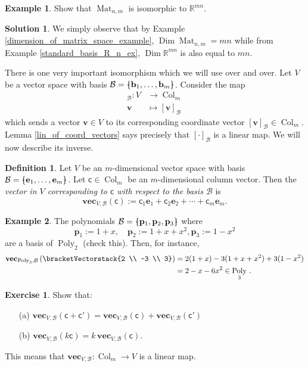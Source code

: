 \documentclass[a4paper,11pt]{book}
\theoremstyle{definition}
\newtheorem{definition}[theorem]{Definition}
\newtheorem{exercise}{Exercise}
\newtheorem{example_environment}{Example}[chapter]
\newtheorem*{solution}{Solution}
\newcommand{\ve}[1]{\mathbf{#1}}
\newcommand{\mat}[1]{\mathsf{#1}}
\newcommand{\basis}[1]{{\mathcal #1}}
\newcommand{\cvector}[1]{\bracketVectorstack{#1}}
\newenvironment{example}
	{
		\begin{oframed} 
		\begin{example_environment}
	}
	{
		\end{example_environment}
		\end{oframed}
	}
\newcommand{\bmark}{\raisebox{.53ex}{\rule{.2em}{.1ex}}}
\newcommand{\bopen}{{\protect\ooalign{\{\cr\hfil\bmark\hfil\cr}}}
\newcommand{\bclose}{{\protect\ooalign{\}\cr\hfil\bmark\hfil\cr}}}
\DeclareMathOperator{\Poly}{Poly}
\DeclareMathOperator{\Mat}{Mat}
\DeclareMathOperator{\Col}{Col}
\DeclareMathOperator{\Dim}{Dim}
\begin{document}
\begin{example} Show that $\Mat_{n,m}$ is isomorphic to $\mathbb{R}^{mn}$.
\begin{solution} We simply observe that by Example
	\ref{dimension_of_matrix_space_example}, $\Dim \Mat_{n,m} = mn$ while
	from Example \ref{standard_basis_R_n_ex}, $\Dim \mathbb{R}^{mn}$ is also equal to  $mn$. 
\end{solution}
\end{example}
There is one very important isomorphism which we will use over and over. Let $V$ be a vector space with basis $\basis{B} = \bopen \ve{b}_1, \ldots, \ve{b}_m \bclose$. Consider the map
\begin{align*}
 [ \cdot ]_\basis{B} : V & \rightarrow \Col_m  \\
  \ve{v} & \mapsto [\ve{v}]_\basis{B} 
\end{align*}
which sends a vector $\ve{v} \in V$ to its corresponding coordinate vector $[\ve{v}]_\basis{B} \in \Col_m$. Lemma \ref{lin_of_coord_vectors} says precisely that $[ \cdot ]_\basis{B}$ is a linear map. We will now describe its inverse.

\begin{definition} Let $V$ be an $m$-dimensional vector space with basis $\basis{B} = \bopen \ve{e}_1, \ldots, \ve{e}_m\bclose$. Let $\mat{c} \in \Col_m$ be an $m$-dimensional column vector.  Then the {\em vector in $V$ corresponding to $\mat{c}$ with respect to the basis $\basis{B}$} is
\[
 \ve{vec}_{V, \basis{B}} (\mat{c}) := \mat{c}_1 \ve{e}_1 + \mat{c}_2 \ve{e}_2 + \cdots + \mat{c}_m \ve{e}_m.
\]
\end{definition}
\begin{example} The polynomials $\basis{B} = \bopen \ve{p}_1, \ve{p}_2, \ve{p}_3 \bclose$ where
\[
 \ve{p}_1 := 1 + x, \quad \ve{p}_2 := 1 + x + x^2, \ve{p}_3 := 1-x^2
\]
are a basis of $\Poly_2$ (check this). Then, for instance,
\begin{align*}
  \ve{vec}_{\Poly_3, \basis{B}} \left( \cvector{2 \\ -3 \\ 3} \right) &= 2(1+x) -3 (1+x+x^2) + 3(1-x^2) \\
  &=  2 -x -6x^2 \in \Poly_3 \, . 
\end{align*}
\end{example}
\begin{exercise} Show that:
\begin{itemize}
\item[(a)]  $\ve{vec}_{V, \basis{B}} (\mat{c} + \mat{c}') = \ve{vec}_{V, \basis{B}} (\mat{c}) + \ve{vec}_{V, \basis{B}} (\mat{c}')$ 
\item[(b)] $\ve{vec}_{V, \basis{B}} (k\mat{c}) = k \, \ve{vec}_{V, \basis{B}} (\mat{c})$. 
\end{itemize}
This means that $\ve{vec}_{V, \basis{B}} : \Col_m \rightarrow V$ is a linear map.
\end{exercise}
\end{document}
